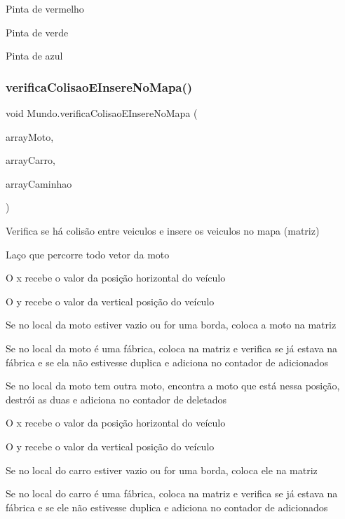 Pinta de vermelho

Pinta de verde

Pinta de azul \mbox{\label{class_mundo_ae896c013603704a78e4e9ca0c3b96356}} 
\subsubsection{\texorpdfstring{verifica\+Colisao\+E\+Insere\+No\+Mapa()}{verificaColisaoEInsereNoMapa()}}
{\footnotesize\ttfamily void Mundo.\+verifica\+Colisao\+E\+Insere\+No\+Mapa (\begin{DoxyParamCaption}\item[{Array\+List$<$ \mbox{\hyperlink{class_moto}{Moto}} $>$}]{array\+Moto,  }\item[{Array\+List$<$ \mbox{\hyperlink{class_carro}{Carro}} $>$}]{array\+Carro,  }\item[{Array\+List$<$ \mbox{\hyperlink{class_caminhao}{Caminhao}} $>$}]{array\+Caminhao }\end{DoxyParamCaption})}



Verifica se há colisão entre veiculos e insere os veiculos no mapa (matriz) 

Laço que percorre todo vetor da moto

O x recebe o valor da posição horizontal do veículo

O y recebe o valor da vertical posição do veículo

Se no local da moto estiver vazio ou for uma borda, coloca a moto na matriz

Se no local da moto é uma fábrica, coloca na matriz e verifica se já estava na fábrica e se ela não estivesse duplica e adiciona no contador de adicionados

Se no local da moto tem outra moto, encontra a moto que está nessa posição, destrói as duas e adiciona no contador de deletados

O x recebe o valor da posição horizontal do veículo

O y recebe o valor da vertical posição do veículo

Se no local do carro estiver vazio ou for uma borda, coloca ele na matriz

Se no local do carro é uma fábrica, coloca na matriz e verifica se já estava na fábrica e se ele não estivesse duplica e adiciona no contador de adicionados

